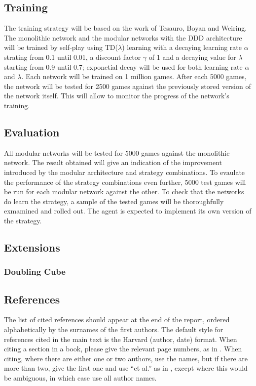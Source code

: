\documentclass[12pt,a4paper]{article}
\begin{document}
\subsection{Training}
The training strategy will be based on the work of Tesauro, Boyan and Weiring. The monolithic network and the modular networks with the DDD architecture will be trained by self-play using TD($\lambda$) learning with a decaying learning rate $\alpha$ strating from 0.1 until 0.01, a discount factor $\gamma$ of 1 and a decaying value for $\lambda$ starting from 0.9 until 0.7; exponetial decay will be used for both learning rate $\alpha$ and $\lambda$. Each network will be trained on 1 million games. After each 5000 games, the network will be tested for 2500 games against the previously stored version of the network itself. This will allow to monitor the progress of the network's training. 


\subsection{Evaluation}
All modular networks will be tested for 5000 games against the monolithic network. The result obtained will give an indication of the improvement introduced by the modular architecture and strategy combinations. To evaulate the performance of the strategy combinations even further, 5000 test games will be run for each modular network against the other. To check that the networks do learn the strategy, a sample of the tested games will be thoroughfully exmamined and rolled out. The agent is expected to implement its own version of the  strategy.

\subsection{Extensions}
\subsubsection{Doubling Cube}

\subsection{References}

The list of cited references should appear at the end of the report, ordered alphabetically by the surnames of the first authors.  The default style for references cited in the main text is the  Harvard (author, date) format.  When citing a section in a book, please give the relevant page numbers, as in \cite[p293]{budgen}.  When citing, where there are either one or two authors, use the names, but if there are more than two, give the first one and use ``et al.'' as in  , except where this would be ambiguous, in which case use all author names.
\end{document}
